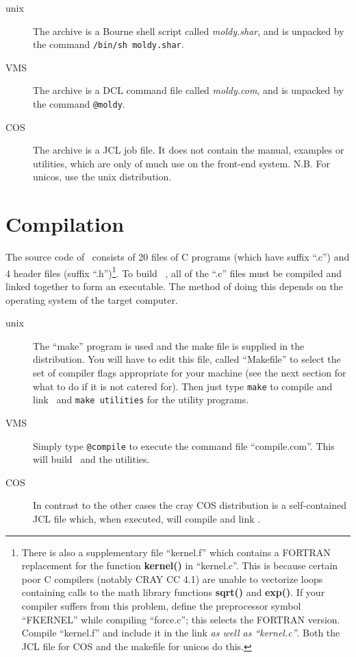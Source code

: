 \begin{description}
\item[unix]  The archive is a Bourne shell
script called {\em moldy.shar}, and is unpacked by the command
\verb'/bin/sh moldy.shar'.

\item[VMS]  The archive is a DCL command file called {\em moldy.com},
and is unpacked by the command \verb'@moldy'.

\item[COS]  The archive is a JCL job file. It does not contain the
manual, examples or utilities, which are only of much use on the
front-end system.  N.B.  For unicos, use the unix distribution.
\end{description}


\section{Compilation}
The source code of \moldy\  consists of 20 files of C programs (which have
suffix ``.c'') and 4 header files (suffix ``.h'')\footnote{There is
also a supplementary file ``kernel.f'' which contains a FORTRAN
replacement for the function {\bf kernel()} in ``kernel.c''. This is
because certain poor C compilers (notably CRAY CC 4.1) are unable
to vectorize loops containing calls to the math library functions {\bf
sqrt()} and {\bf exp()}.  If your compiler suffers from this problem,
define the preprocessor symbol ``FKERNEL'' while compiling
``force.c''; this selects the FORTRAN version. Compile ``kernel.f''
and include it in the link {\em as well as ``kernel.c''}.  Both the
JCL file for COS and the makefile for unicos do this.}.
To build \moldy\ , all of the ``.c'' files must be compiled and linked
together to form an executable.  The method of doing this depends on
the operating system of the target computer.
\begin{description}
\item[unix]  The ``make'' program is used and the make file is
supplied in the distribution.  You will have to edit this file, called
``Makefile'' to select the  set of compiler flags appropriate for your
machine (see the next section for what to do if it is not catered
for). Then just type \verb'make' to compile and link \moldy\  and
\verb'make utilities' for the utility programs.

\item[VMS]  Simply type \verb'@compile' to execute the command file
``compile.com''. This will build \moldy\  and the utilities.

\item[COS]  In contrast to the other cases the cray COS distribution
is a self-contained JCL  file which, when executed, will compile and
link \moldy. 
\end{description}

